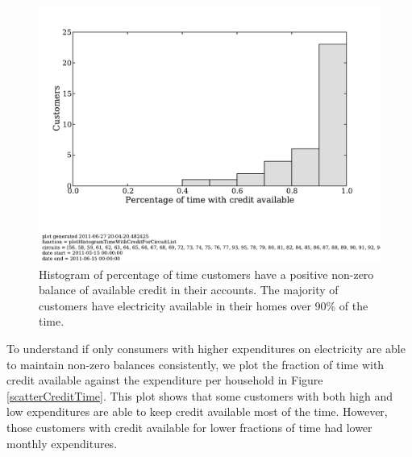 \documentclass{sig-alternate}
\begin{document}
\begin{figure}[]
\begin{center}
\includegraphics[trim = 0in 1.3in 0in 0in, clip, width=\columnwidth]
                {figures/creditHistogram.pdf}
\end{center}
\caption{Histogram of percentage of time customers have a positive non-zero balance
of available credit in their accounts.  The majority of customers have electricity
available in their homes over 90\% of the time.}
\label{creditHistogram}
\end{figure}

To understand if only consumers with higher expenditures on electricity
are able to maintain non-zero balances consistently, we plot the fraction of
time with credit available against the expenditure per household in
Figure \ref{scatterCreditTime}.
This plot
shows that some customers with both high and low expenditures are able
to keep credit available most of the time.
However, those customers with credit available for lower fractions of time had lower
monthly expenditures.
\end{document}
